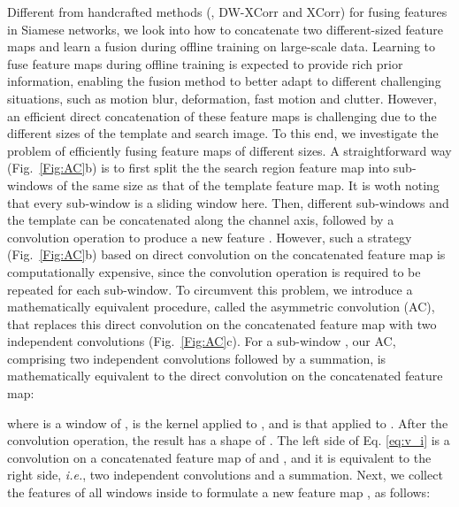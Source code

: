 \documentclass[10pt,twocolumn,letterpaper,final]{cvpr}
\begin{document}
Different from handcrafted methods (\eg, DW-XCorr and XCorr) for fusing features in Siamese networks, we look into how to concatenate two different-sized feature maps and learn a fusion during offline training on large-scale data. Learning to fuse feature maps during offline training is expected to provide rich prior information, enabling the fusion method to better adapt to different challenging situations, such as motion blur, deformation, fast motion and clutter. However, an efficient direct concatenation of these feature maps is challenging due to the different sizes of the template and search image. To this end, we investigate the problem of efficiently fusing feature maps of different sizes. A straightforward way (Fig.~\ref{Fig:AC}b) is to first split the the search region feature map into  sub-windows of the same size as that of the template feature map. It is woth noting that every sub-window is a sliding window here. Then,  different sub-windows and the template can be concatenated along the channel axis, followed by a convolution operation to produce a new feature . However, such a strategy (Fig.~\ref{Fig:AC}b) based on direct convolution on the concatenated feature map is computationally expensive, since the convolution operation is required to be repeated for each sub-window.
To circumvent this problem, we introduce a mathematically equivalent procedure, called the asymmetric convolution (AC), that replaces this direct convolution on the concatenated feature map with two independent convolutions (Fig.~\ref{Fig:AC}c). For a sub-window , our AC,  comprising two independent convolutions followed by a summation, is mathematically equivalent to the direct convolution on the concatenated feature map:








where  is a window of ,  is the kernel applied to , and  is that applied to . After the convolution operation, the result  has a shape of . The left side of Eq. \ref{eq:v_i} is a convolution on a concatenated feature map of  and , and it is equivalent to the right side, {\it i.e.}, two independent convolutions and a summation. Next, we collect the features of all windows inside  to formulate a new feature map , as follows:
\end{document}
